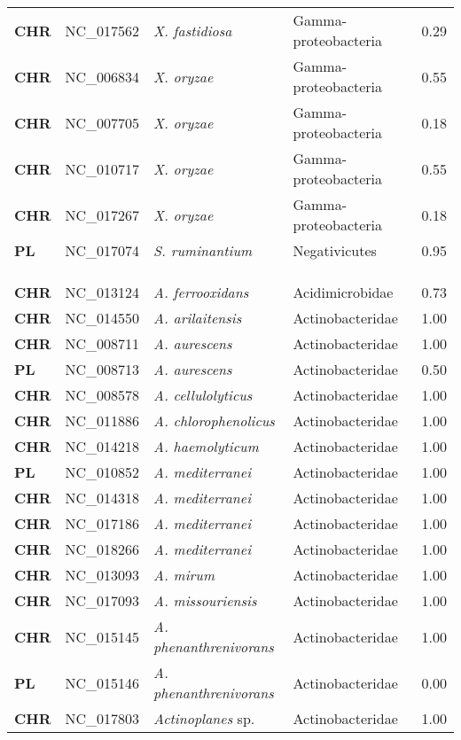 \begin{adjustwidth}{-3cm}{2cm}
{\begin{supertabular}{>{\bfseries}l|p{0.1\textwidth}p{0.14\textwidth}l|l}
CHR & NC\_017562 & \textit{X. fastidiosa} & Gamma-proteobacteria & 0.29\\
CHR & NC\_006834 & \textit{X. oryzae} & Gamma-proteobacteria & 0.55\\
CHR & NC\_007705 & \textit{X. oryzae} & Gamma-proteobacteria & 0.18\\
CHR & NC\_010717 & \textit{X. oryzae} & Gamma-proteobacteria & 0.55\\
CHR & NC\_017267 & \textit{X. oryzae} & Gamma-proteobacteria & 0.18\\
PL & NC\_017074 & \textit{S. ruminantium} & Negativicutes & 0.95\\
\\
\\
\hline\\
CHR & NC\_013124 & \textit{A. ferrooxidans} & Acidimicrobidae & 0.73\\
CHR & NC\_014550 & \textit{A. arilaitensis} & Actinobacteridae & 1.00\\
CHR & NC\_008711 & \textit{A. aurescens} & Actinobacteridae & 1.00\\
PL & NC\_008713 & \textit{A. aurescens} & Actinobacteridae & 0.50\\
CHR & NC\_008578 & \textit{A. cellulolyticus} & Actinobacteridae & 1.00\\
CHR & NC\_011886 & \textit{A. chlorophenolicus} & Actinobacteridae & 1.00\\
CHR & NC\_014218 & \textit{A. haemolyticum} & Actinobacteridae & 1.00\\
PL & NC\_010852 & \textit{A. mediterranei} & Actinobacteridae & 1.00\\
CHR & NC\_014318 & \textit{A. mediterranei} & Actinobacteridae & 1.00\\
CHR & NC\_017186 & \textit{A. mediterranei} & Actinobacteridae & 1.00\\
CHR & NC\_018266 & \textit{A. mediterranei} & Actinobacteridae & 1.00\\
CHR & NC\_013093 & \textit{A. mirum} & Actinobacteridae & 1.00\\
CHR & NC\_017093 & \textit{A. missouriensis} & Actinobacteridae & 1.00\\
CHR & NC\_015145 & \textit{A. phenanthrenivorans} & Actinobacteridae & 1.00\\
PL & NC\_015146 & \textit{A. phenanthrenivorans} & Actinobacteridae & 0.00\\
CHR & NC\_017803 & \textit{Actinoplanes} sp. & Actinobacteridae & 1.00\\

\end{supertabular}}
\end{adjustwidth}
